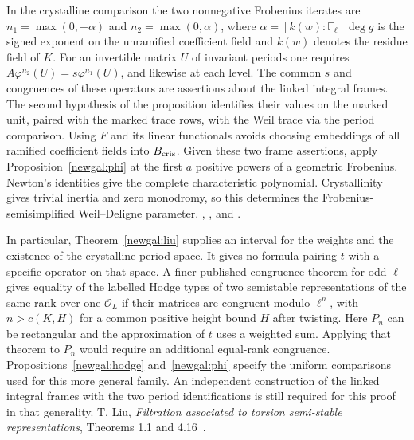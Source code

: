 In the crystalline comparison the two nonnegative Frobenius iterates are
$n_1=\max(0,-\alpha)$ and $n_2=\max(0,\alpha)$, where
$\alpha=[k(w):\mathbb F_\ell]\deg g$ is the signed exponent on the
unramified coefficient field and $k(w)$ denotes the residue field of $K$.
For an invertible matrix $U$ of invariant periods one requires
$A\varphi^{n_2}(U)=s\varphi^{n_1}(U)$, and likewise at each level.
The common $s$ and congruences of these operators are assertions about
the linked integral frames. The second hypothesis of the proposition
identifies their values on the marked unit, paired with the marked trace
rows, with the Weil trace via the period comparison. Using $F$ and its
linear functionals avoids choosing embeddings of all ramified coefficient
fields into $B_{\rm cris}$. Given these two frame assertions, apply
Proposition~\ref{newgal:phi} at the first $a$ positive powers of a
geometric Frobenius. Newton's identities give the complete characteristic
polynomial. Crystallinity gives trivial inertia and zero monodromy,
so this determines the Frobenius-semisimplified Weil--Deligne parameter.
,
, and
.

In particular, Theorem~\ref{newgal:liu} supplies an interval for the
weights and the existence of the crystalline period space. It gives no
formula pairing $t$ with a specific operator on that space. A finer
published congruence theorem for odd $\ell$ gives equality of the labelled
Hodge types of two semistable representations of the same rank over one
$\mathcal O_L$ if their matrices are congruent modulo $\ell^n$, with
$n>c(K,H)$ for a common positive height bound $H$ after twisting.
Here $P_n$ can be rectangular and the approximation of $t$ uses a
weighted sum. Applying that theorem to $P_n$ would require an additional
equal-rank congruence. Propositions~\ref{newgal:hodge} and~\ref{newgal:phi}
specify the uniform comparisons used for this more general family. An
independent construction of the linked integral frames with the two
period identifications is still required for this proof in that generality.
T. Liu,
\emph{Filtration associated to torsion semi-stable representations},
Theorems 1.1 and 4.16~\cite{liuFiltration}.

